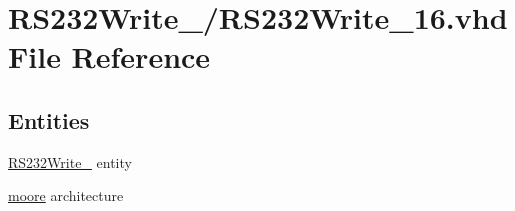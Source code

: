 \hypertarget{_r_s232_write__16_8vhd}{}\section{R\+S232\+Write\+\_/\+R\+S232\+Write\+\_\+16.vhd File Reference}
\label{_r_s232_write__16_8vhd}
\subsection*{Entities}
\begin{DoxyCompactItemize}
\item 
\hyperlink{class_r_s232_write__16}{R\+S232\+Write\+\_} entity
\item 
\hyperlink{class_r_s232_write__16_1_1moore}{moore} architecture
\end{DoxyCompactItemize}
